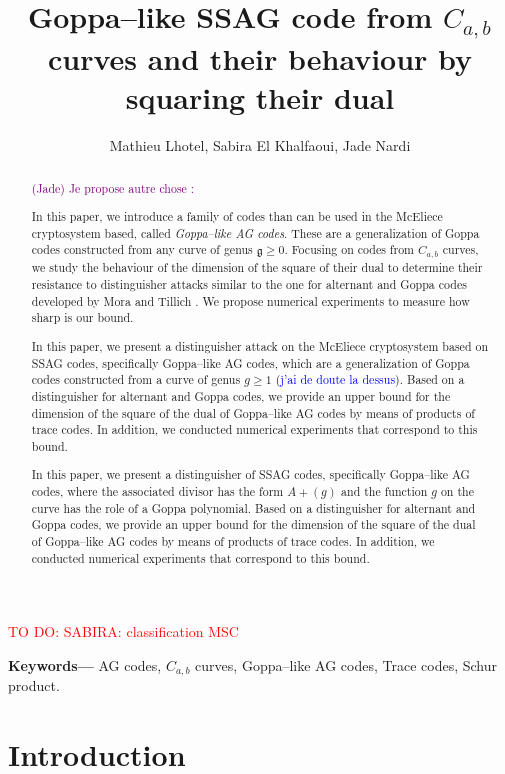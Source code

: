 \documentclass[a4paper]{article}
\title{Goppa--like SSAG code from $C_{a,b}$ curves and their behaviour by squaring their dual}
\author{Mathieu Lhotel, Sabira El Khalfaoui, Jade Nardi}
\date{}
\theoremstyle{definition}
\theoremstyle{remark}
\newcommand\jade[1]{\textcolor{purple}{#1}}
\newcommand\TODO[1]{\textcolor{red}{TO DO: #1}}
\newcommand\sabira[1]{\textcolor{blue}{#1}}
\providecommand{\keywords}[1]{\textbf{Keywords---} #1}
\begin{document}

\maketitle

\TODO{SABIRA: classification MSC}
\begin{abstract}
	\jade{(Jade) Je propose autre chose :}
	
	In this paper, we introduce a family of codes than can be used in the McEliece cryptosystem based, called \emph{Goppa--like AG codes}. These are a generalization of Goppa codes constructed from any curve of genus $\mathfrak{g} \geq 0$. Focusing on codes from $C_{a,b}$ curves, we study the behaviour of the dimension of the square of their dual to determine their resistance to distinguisher attacks similar to the one for alternant and Goppa codes developed by Mora and Tillich \cite{MT21}. We propose numerical experiments to measure how sharp is our bound.
	
	\bigskip
	
	In this paper, we present a distinguisher attack on the McEliece cryptosystem based on SSAG codes, specifically Goppa--like AG codes, which are a generalization of Goppa codes constructed from a curve of genus $g \geq 1$ (\sabira{j'ai de doute la dessus}). Based on a distinguisher for alternant and Goppa codes, we provide an upper bound for the dimension of the square of the dual of Goppa--like AG codes by means of products of trace codes. In addition, we conducted numerical experiments that correspond to this bound.
	\vskip 0.5cm
	
	In this paper, we present a distinguisher of SSAG codes, specifically Goppa--like AG codes, where the associated divisor has the form $A+(g)$ and the function $g$ on the curve has the role of a Goppa polynomial. Based on a distinguisher for alternant and Goppa codes, we provide an upper bound for the dimension of the square of the dual of Goppa--like AG codes by means of products of trace codes. In addition, we conducted numerical experiments that correspond to this bound.
\end{abstract}

\keywords{AG codes, $C_{a,b}$ curves, Goppa--like AG codes, Trace codes, Schur product.}

\section*{Introduction}
\end{document}
